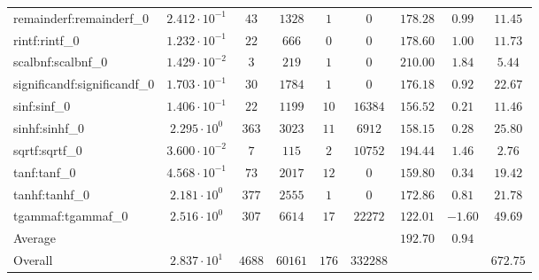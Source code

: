 \begin{tabular}{|l|c|c|c|c|c|c|c|c|}
remainderf:remainderf\_0     & $ 2.412 \cdot 10^{-1} $ & $ 43     $ & $ 1328  $ & $ 1   $ & $ 0      $ & $ 178.28      $ & $ 0.99    $ & $ 11.45   $ \\
rintf:rintf\_0               & $ 1.232 \cdot 10^{-1} $ & $ 22     $ & $ 666   $ & $ 0   $ & $ 0      $ & $ 178.60      $ & $ 1.00    $ & $ 11.73   $ \\
scalbnf:scalbnf\_0           & $ 1.429 \cdot 10^{-2} $ & $ 3      $ & $ 219   $ & $ 1   $ & $ 0      $ & $ 210.00      $ & $ 1.84    $ & $ 5.44    $ \\
significandf:significandf\_0 & $ 1.703 \cdot 10^{-1} $ & $ 30     $ & $ 1784  $ & $ 1   $ & $ 0      $ & $ 176.18      $ & $ 0.92    $ & $ 22.67   $ \\
sinf:sinf\_0                 & $ 1.406 \cdot 10^{-1} $ & $ 22     $ & $ 1199  $ & $ 10  $ & $ 16384  $ & $ 156.52      $ & $ 0.21    $ & $ 11.46   $ \\
sinhf:sinhf\_0               & $ 2.295 \cdot 10^{0}  $ & $ 363    $ & $ 3023  $ & $ 11  $ & $ 6912   $ & $ 158.15      $ & $ 0.28    $ & $ 25.80   $ \\
sqrtf:sqrtf\_0               & $ 3.600 \cdot 10^{-2} $ & $ 7      $ & $ 115   $ & $ 2   $ & $ 10752  $ & $ 194.44      $ & $ 1.46    $ & $ 2.76    $ \\
tanf:tanf\_0                 & $ 4.568 \cdot 10^{-1} $ & $ 73     $ & $ 2017  $ & $ 12  $ & $ 0      $ & $ 159.80      $ & $ 0.34    $ & $ 19.42   $ \\
tanhf:tanhf\_0               & $ 2.181 \cdot 10^{0}  $ & $ 377    $ & $ 2555  $ & $ 1   $ & $ 0      $ & $ 172.86      $ & $ 0.81    $ & $ 21.78   $ \\
tgammaf:tgammaf\_0           & $ 2.516 \cdot 10^{0}  $ & $ 307    $ & $ 6614  $ & $ 17  $ & $ 22272  $ & $ 122.01      $ & $ -1.60   $ & $ 49.69   $ \\
\hline
Average                      & $                     $ & $        $ & $       $ & $     $ & $        $ & $ 192.70      $ & $ 0.94    $ & $         $ \\
\hline
Overall                      & $ 2.837 \cdot 10^{1}  $ & $ 4688   $ & $ 60161 $ & $ 176 $ & $ 332288 $ & $             $ & $         $ & $ 672.75  $ \\
\hline
\end{tabular}
